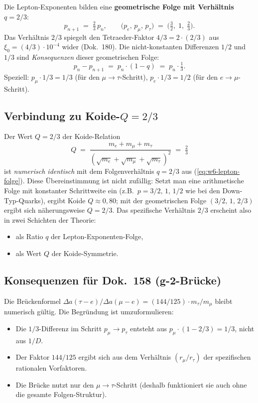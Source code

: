 Die Lepton-Exponenten bilden eine \textbf{geometrische Folge mit
Verhältnis $q = 2/3$}:
\begin{equation}
  p_{n+1} \;=\; \tfrac{2}{3}\, p_n,
  \qquad
  \bigl(p_e,\, p_\mu,\, p_\tau\bigr)
  \;=\; \bigl(\tfrac{3}{2},\;1,\;\tfrac{2}{3}\bigr).
  \label{eq:w6-lepton-folge}
\end{equation}
Das Verhältnis $2/3$ spiegelt den Tetraeder-Faktor $4/3 = 2\cdot(2/3)$ aus
$\xi_0 = (4/3) \cdot 10^{-4}$ wider (Dok.~180). Die nicht-konstanten
Differenzen $1/2$ und $1/3$ sind \emph{Konsequenzen} dieser
geometrischen Folge:
\begin{equation}
  p_n - p_{n+1} \;=\; p_n \cdot (1 - q) \;=\; p_n \cdot \tfrac{1}{3}.
\end{equation}
Speziell: $p_\mu \cdot 1/3 = 1/3$ (für den $\mu \to \tau$-Schritt),
$p_e \cdot 1/3 = 1/2$ (für den $e \to \mu$-Schritt).

\subsection*{Verbindung zu Koide-$Q = 2/3$}

Der Wert $Q = 2/3$ der Koide-Relation
\begin{equation}
  Q \;=\; \frac{m_e + m_\mu + m_\tau}{(\sqrt{m_e}+\sqrt{m_\mu}+\sqrt{m_\tau})^2}
  \;=\; \tfrac{2}{3}
\end{equation}
ist \emph{numerisch identisch} mit dem Folgenverhältnis $q = 2/3$ aus
(\ref{eq:w6-lepton-folge}). Diese Übereinstimmung ist nicht zufällig:
Setzt man eine arithmetische Folge mit konstanter Schrittweite ein
(z.B.\ $p = 3/2,\,1,\,1/2$ wie bei den Down-Typ-Quarks), ergibt Koide
$Q \approx 0{,}80$; mit der geometrischen Folge $(3/2,\,1,\,2/3)$
ergibt sich näherungsweise $Q = 2/3$. Das spezifische Verhältnis $2/3$ erscheint
also in zwei Schichten der Theorie:
\begin{itemize}[leftmargin=2em,itemsep=2pt,topsep=2pt]
  \item als Ratio $q$ der Lepton-Exponenten-Folge,
  \item als Wert $Q$ der Koide-Symmetrie.
\end{itemize}

\subsection*{Konsequenzen für Dok.~158 (g-2-Brücke)}

Die Brückenformel
$\Delta a(\tau{-}e)/\Delta a(\mu{-}e) = (144/125) \cdot m_\tau/m_\mu$
bleibt numerisch gültig. Die Begründung ist umzuformulieren:
\begin{itemize}[leftmargin=2em,itemsep=2pt,topsep=2pt]
  \item Die $1/3$-Differenz im Schritt $p_\mu \to p_\tau$ entsteht aus
        $p_\mu \cdot (1 - 2/3) = 1/3$, nicht aus $1/D$.
  \item Der Faktor $144/125$ ergibt sich aus dem Verhältnis
        $(r_\mu/r_\tau)$ der spezifischen rationalen Vorfaktoren.
  \item Die Brücke nutzt nur den $\mu \to \tau$-Schritt (deshalb
        funktioniert sie auch ohne die gesamte Folgen-Struktur).
\end{itemize}

